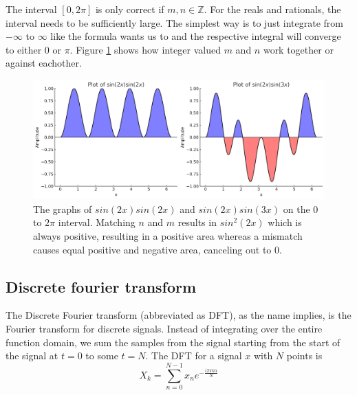 The interval $[0, 2\pi]$ is only correct if $m, n \in \mathbb{Z}$. For the reals and rationals, the interval needs to be sufficiently large. The simplest way is to just integrate from $-\infty$ to $\infty$ like the formula wants us to and the respective integral will converge to either $0$ or $\pi$. Figure \ref{fig:transformIdea} shows how integer valued $m$ and $n$ work together or against eachother. 

\begin{figure}[ht]
    \centering
    \includegraphics[width=\textwidth]{./images/transformIdea.png}
    \caption{The graphs of $sin(2x)sin(2x)$ and $sin(2x)sin(3x)$ on the $0$ to $2\pi$ interval. Matching $n$ and $m$ results in $sin^2(2x)$ which is always positive, resulting in a positive area whereas a mismatch causes equal positive and negative area, canceling out to 0.\label{fig:transformIdea}}
\end{figure}

\subsection{Discrete fourier transform} 
The Discrete Fourier transform (abbreviated as DFT), as the name implies, is the Fourier transform for discrete signals. Instead of integrating over the entire function domain, we sum the samples from the signal starting from the start of the signal at $t=0$ to some $t=N$. The DFT for a signal $x$ with $N$ points is 
$$X_k = \sum_{n=0}^{N-1} x_ne^{-\frac{i2\pi kn}{N}}$$

